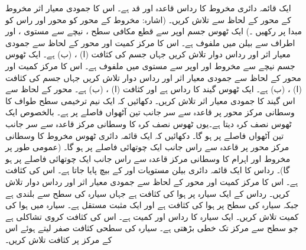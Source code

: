ایک قائمہ دائری مخروط کا رداس قاعدہ  اور قد  ہے۔ اس کا جمودی معیار اثر مخروط کے محور کے لحاظ سے تلاش کریں۔ (اشارہ: مخروط کے محور کو محور  اور راس کو مبدا پر رکھیں ۔)
ایک ٹھوس جسم اوپر سے قطع مکافی سطح ، نیچے سے مستوی ،  اور اطراف سے بیلن  میں ملفوف ہے۔ اس کا مرکز کمیت اور محور  کے لحاظ سے جمودی معیار اثر اور رداس دوار تلاش کریں جہاں جسم کی کثافت  (ا) ، (ب)  ہے۔
ایک ٹھوس جسم نیچے سے مخروط  اور اوپر سے مستوی   میں ملفوف ہے۔ اس کا مرکز کمیت اور محور  کے لحاظ سے جمودی معیار اثر اور رداس دوار تلاش کریں  جہاں جسم کی کثافت (ا) ، (ب)  ہے۔
ایک ٹھوس گیند کا رداس  ہے اور  کثافت (ا) ، (ب)  ہے۔ محور  کے لحاظ سے اس گیند کا جمودی معیار اثر تلاش کریں۔
دکھائیں کہ ایک نیم  ترخیمی سطح طواف   کا وسطانی مرکز محور  پر  قاعدہ سے  سر جانب  تین آٹھواں فاصلے پر ہے۔ بالخصوص  ایک  ٹھوس نصف کرہ دیتا ہے۔یوں ٹھوس نصف کرہ کا وسطانی مرکز قاعدہ سے سر جانب تین آٹھواں فاصلے پر ہو گا۔
دکھائیں کہ ایک قائمہ دائری  ٹھوس مخروط کا وسطانی مرکز محور پر قاعدہ سے راس جانب ایک  چوتھائی فاصلے  پر ہو گا۔ (عمومی طور پر مخروط اور  اہرام کا وسطانی مرکز قاعدہ سے راس جانب ایک چوتھائی فاصلے  پر ہو گا)۔
رداس  کا ایک قائمہ دائری بیلن  مستویات  اور  کے بیچ پایا جاتا ہے۔ اس کی کثافت  ہے۔ اس کا مرکز کمیت اور محور  کے لحاظ سے جمودی معیار اثر اور رداس دوار تلاش کریں۔
 رداس  کے ایک سیارہ پر  ہوا کی کثافت  ہے جہاں سیارہ کی سطح سے بلندی   ہے جبکہ سیارہ کی سطح پر ہوا کی کثافت  ہے اور  ایک مثبت  مستقل ہے۔ سیارہ میں ہوا کی کمیت تلاش کریں۔
ایک سیارہ کا رداس  اور کمیت  ہے۔ اس کی کثافت کروی تشاکلی ہے جو  سطح سے مرکز تک خطی بڑھتی ہے۔ سیارہ کی سطحی کثافت صفر لیتے ہوئے  اس  کے مرکز پر کثافت تلاش کریں۔


